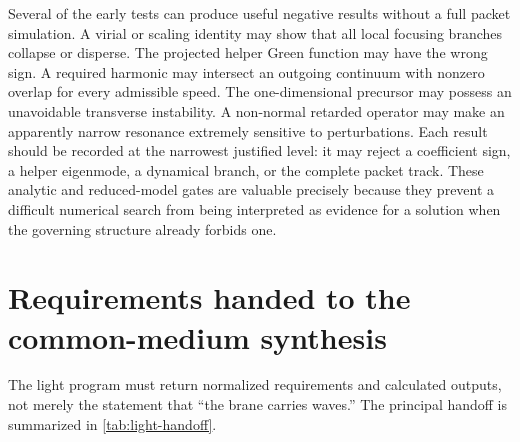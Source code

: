 Several of the early tests can produce useful negative results without a full
packet simulation. A virial or scaling identity may show that all local focusing
branches collapse or disperse. The projected helper Green function may have the
wrong sign. A required harmonic may intersect an outgoing continuum with
nonzero overlap for every admissible speed. The one-dimensional precursor may
possess an unavoidable transverse instability. A non-normal retarded operator
may make an apparently narrow resonance extremely sensitive to perturbations.
Each result should be recorded at the narrowest justified level: it may reject a
coefficient sign, a helper eigenmode, a dynamical branch, or the complete packet
track. These analytic and reduced-model gates are valuable precisely because
they prevent a difficult numerical search from being interpreted as evidence
for a solution when the governing structure already forbids one.

\section{Requirements handed to the common-medium synthesis}

The light program must return normalized requirements and calculated outputs,
not merely the statement that ``the brane carries waves.'' The principal
handoff is summarized in \cref{tab:light-handoff}.

